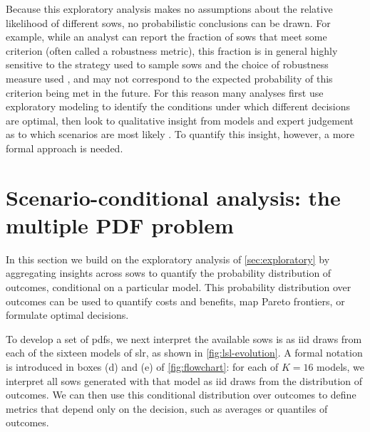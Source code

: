 \documentclass[11pt]{article}
\makeatletter
\newcommand{\james}[1]{\todo[color=giallo, textcolor=nero]{\textbf{ATTN James:~}#1}} %
\DeclareRobustCommand\onedot{\futurelet\@let@token\@onedot}
\def\@onedot{\ifx\@let@token.\else.\null\fi\xspace}
\def\eg{\emph{e.g}\onedot} \def\Eg{\emph{E.g}\onedot}
\DeclareRobustCommand\onedot{\futurelet\@let@token\@onedot}
\def\@onedot{\ifx\@let@token.\else.\null\fi\xspace}
\def\eg{\emph{e.g}\onedot} \def\Eg{\emph{E.g}\onedot}
\makeatother
\begin{document}
Because this exploratory analysis makes no assumptions about the relative likelihood of different \glspl{sow}, no probabilistic conclusions can be drawn.
For example, while an analyst can report the fraction of \glspl{sow} that meet some criterion (often called a robustness metric), this fraction is in general highly sensitive to the strategy used to sample \glspl{sow} \citep{quinn_exploratory:2020} and the choice of robustness measure used \citep{mcphail_robustness:2019}, and may not correspond to the expected probability of this criterion being met in the future.
For this reason many analyses first use exploratory modeling to identify the conditions under which different decisions are optimal, then look to qualitative insight from models and expert judgement as to which scenarios are most likely \citep[\eg,][]{Brown:2012kb,Steinschneider:2015kk}.
To quantify this insight, however, a more formal approach is needed.\james{Revisit this wording perhaps}

\section{Scenario-conditional analysis: the multiple PDF problem}\label{sec:multiple-pdf}

In this section we build on the exploratory analysis of \cref{sec:exploratory} by aggregating insights across \glspl{sow} to quantify the probability distribution of outcomes, conditional on a particular model.
This probability distribution over outcomes can be used to quantify costs and benefits, map Pareto frontiers, or formulate optimal decisions.

To develop a set of \glspl{pdf}, we next interpret the available \glspl{sow} is as \gls{iid} draws from each of the sixteen models of \gls{slr}, as shown in \cref{fig:lsl-evolution}.
A formal notation is introduced in boxes (d) and (e) of \cref{fig:flowchart}: for each of $K=16$ models, we interpret all \glspl{sow} generated with that model as \gls{iid} draws from the distribution of outcomes.
We can then use this conditional distribution over outcomes to define metrics that depend only on the decision, such as averages or quantiles of outcomes.
\end{document}
